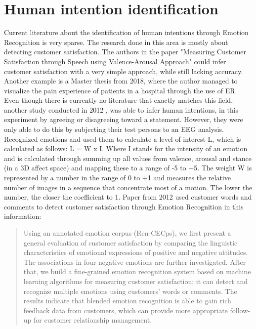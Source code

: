 \section{Human intention identification}
Current literature about the identification of human intentions through Emotion Recognition is very sparse. The research done in this area is mostly about detecting customer satisfaction. The authors in the paper "Measuring Customer Satisfaction through Speech using Valence-Arousal Approach" \cite{Kamaruddin:2016:MeasuringCustomerSatisfaction} could infer customer satisfaction with a very simple approach, while still lacking accuracy. Another example is a Master thesis from 2018, where the author \cite{Esser:2018:LandmarkDetection} managed to visualize the pain experience of patients in a hospital through the use of \gls{ER}. Even though there is currently no literature that exactly matches this field, another study conducted in 2012 \cite{Dong:2012:UnderstandHumanImplicitIntention}, was able to infer human intentions, in this experiment by agreeing or disagreeing toward a statement. However, they were only able to do this by subjecting their test persons to an \gls{EEG} analysis.
\newline\newline
Recognized emotions and used them to calculate a level of interest L, which is calculated as follows: L = W x I. Where I stands for the intensity of an emotion and is calculated through summing up all values from valence, arousal and stance (in a 3D affect space) and mapping these to a range of -5 to +5.
The weight W is represented by a number in the range of 0 to +1 and measures the relative number of images in a sequence that concentrate most of a motion. The lower the number, the closer the coefficient to 1.\cite{Yeasin:2006:MeasurmentOfInterestFromVideo}
\newline\newline
Paper from 2012 used customer words and comments to detect customer satisfaction through Emotion Recognition in this information:
\begin{quote}
    Using an annotated emotion corpus (Ren-CECps), we
    first present a general evaluation of customer satisfaction
    by comparing the linguistic characteristics of emotional
    expressions of positive and negative attitudes. The associations in four negative emotions are further investigated.
    After that, we build a fine-grained emotion recognition
    system based on machine learning algorithms for measuring customer satisfaction; it can detect and recognize
    multiple emotions using customers’ words or comments.
    The results indicate that blended emotion recognition is
    able to gain rich feedback data from customers, which can
    provide more appropriate follow-up for customer relationship management.\cite{Ren:2012:ERforCustomerSatisfaction}
\end{quote}

